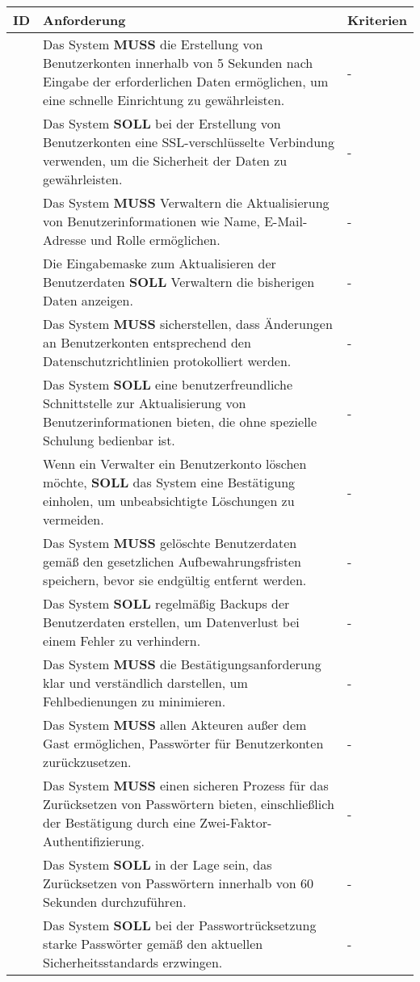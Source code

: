 \newpage

\begin{tabular} {|p{}|p{}|p{}|}
	\hline
	ID & Anforderung & Kriterien \\
	\hline
	\printfreqnr
	& Das System \textbf{MUSS} die Erstellung von Benutzerkonten innerhalb von 5 Sekunden nach Eingabe der erforderlichen Daten ermöglichen, um eine schnelle Einrichtung zu gewährleisten. 
	& - \\ 
	\hline
	\printfreqnr
	& Das System \textbf{SOLL} bei der Erstellung von Benutzerkonten eine SSL-verschlüsselte Verbindung verwenden, um die Sicherheit der Daten zu gewährleisten.
	& - \\ 
	\hline
	\printfreqnr
	& Das System \textbf{MUSS} Verwaltern die Aktualisierung von Benutzerinformationen wie Name, E-Mail-Adresse und Rolle ermöglichen.
	& - \\ 
	\hline
	\printfreqnr
	& Die Eingabemaske zum Aktualisieren der Benutzerdaten \textbf{SOLL} Verwaltern die bisherigen Daten anzeigen.
	& - \\ 
	\hline
	\printfreqnr
	& Das System \textbf{MUSS} sicherstellen, dass Änderungen an Benutzerkonten entsprechend den Datenschutzrichtlinien protokolliert werden.
	& - \\ 
	\hline
	\printfreqnr
	& Das System \textbf{SOLL} eine benutzerfreundliche Schnittstelle zur Aktualisierung von Benutzerinformationen bieten, die ohne spezielle Schulung bedienbar ist.
	& - \\ 
	\hline
	\printfreqnr
	& Wenn ein Verwalter ein Benutzerkonto löschen möchte, \textbf{SOLL} das System eine Bestätigung einholen, um unbeabsichtigte Löschungen zu vermeiden.
	& - \\ 
	\hline
	\printfreqnr
	& Das System \textbf{MUSS} gelöschte Benutzerdaten gemäß den gesetzlichen Aufbewahrungsfristen speichern, bevor sie endgültig entfernt werden.
	& - \\ 
	\hline
	\printfreqnr
	& Das System \textbf{SOLL} regelmäßig Backups der Benutzerdaten erstellen, um Datenverlust bei einem Fehler zu verhindern.
	& - \\ 
	\hline
	\printfreqnr
	& Das System \textbf{MUSS} die Bestätigungsanforderung klar und verständlich darstellen, um Fehlbedienungen zu minimieren.
	& - \\ 
	\hline
	\printfreqnr
	& Das System \textbf{MUSS} allen Akteuren außer dem Gast  ermöglichen, Passwörter für Benutzerkonten zurückzusetzen. 
	& - \\
	\hline
	\printfreqnr
	& Das System \textbf{MUSS} einen sicheren Prozess für das Zurücksetzen von Passwörtern bieten, einschließlich der Bestätigung durch eine Zwei-Faktor-Authentifizierung. 
	& - \\
	\hline
	\printfreqnr
	& Das System \textbf{SOLL} in der Lage sein, das Zurücksetzen von Passwörtern innerhalb von 60 Sekunden durchzuführen. 
	& - \\
	\hline
	\printfreqnr
	& Das System \textbf{SOLL} bei der Passwortrücksetzung starke Passwörter gemäß den aktuellen Sicherheitsstandards erzwingen. 
	& - \\
	\hline
\end{tabular}

